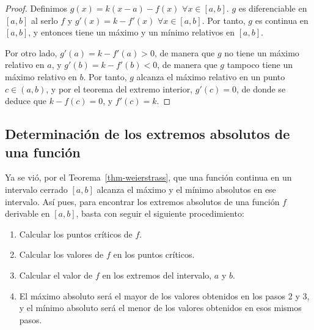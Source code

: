 \documentclass[
  a4paper,
]{scrreport}
\providecommand{\tightlist}{%
  \setlength{\itemsep}{0pt}\setlength{\parskip}{0pt}}\usepackage{longtable,booktabs,array}
\theoremstyle{plain}
\theoremstyle{definition}
\theoremstyle{plain}
\theoremstyle{plain}
\theoremstyle{definition}
\theoremstyle{definition}
\theoremstyle{remark}
\begin{document}
\begin{tcolorbox}[enhanced jigsaw, titlerule=0mm, arc=.35mm, colframe=quarto-callout-note-color-frame, bottomrule=.15mm, opacitybacktitle=0.6, rightrule=.15mm, coltitle=black, colback=white, toprule=.15mm, title=\textcolor{quarto-callout-note-color}{\faInfo}\hspace{0.5em}{Demostración}, leftrule=.75mm, bottomtitle=1mm, opacityback=0, breakable, colbacktitle=quarto-callout-note-color!10!white, toptitle=1mm, left=2mm]

\begin{proof}
Definimos \(g(x)=k(x-a)-f(x)\) \(\forall x\in[a,b]\). \(g\) es
diferenciable en \([a,b]\) al serlo \(f\) y \(g'(x)=k-f'(x)\)
\(\forall x\in[a,b]\). Por tanto, \(g\) es continua en \([a,b]\), y
entonces tiene un máximo y un mínimo relativos en \([a,b]\).

Por otro lado, \(g'(a)=k-f'(a)>0\), de manera que \(g\) no tiene un
máximo relativo en \(a\), y \(g'(b)=k-f'(b)<0\), de manera que \(g\)
tampoco tiene un máximo relativo en \(b\). Por tanto, \(g\) alcanza el
máximo relativo en un punto \(c\in (a,b)\), y por el teorema del extremo
interior, \(g'(c)=0\), de donde se deduce que \(k-f(c)=0\), y
\(f'(c)=k\).
\end{proof}

\end{tcolorbox}

\subsection{Determinación de los extremos absolutos de una
función}\label{determinaciuxf3n-de-los-extremos-absolutos-de-una-funciuxf3n}

Ya se vió, por el Teorema~\ref{thm-weierstrass}, que una función
continua en un intervalo cerrado \([a,b]\) alcanza el máximo y el mínimo
absolutos en ese intervalo. Así pues, para encontrar los extremos
absolutos de una función \(f\) derivable en \([a,b]\), basta con seguir
el siguiente procedimiento:

\begin{enumerate}
\def\labelenumi{\arabic{enumi}.}
\tightlist
\item
  Calcular los puntos críticos de \(f\).
\item
  Calcular los valores de \(f\) en los puntos críticos.
\item
  Calcular el valor de \(f\) en los extremos del intervalo, \(a\) y
  \(b\).
\item
  El máximo absoluto será el mayor de los valores obtenidos en los pasos
  2 y 3, y el mínimo absoluto será el menor de los valores obtenidos en
  esos mismos pasos.
\end{enumerate}
\end{document}
